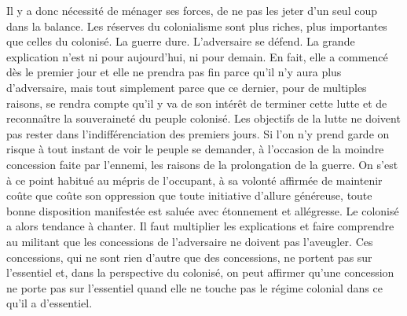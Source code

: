 \documentclass[french,twoside]{book} %
\begin{document}
Il y a donc nécessité de ménager ses forces, de ne pas les jeter d’un seul coup dans la balance. Les réserves du colonialisme sont plus riches, plus importantes que celles du colonisé. La guerre dure. L’adversaire se défend. La grande explication   n’est ni pour aujourd’hui, ni pour demain. En fait, elle a commencé dès le premier jour et elle ne prendra pas fin parce qu’il n’y aura plus d’adversaire, mais tout simplement parce que ce dernier, pour de multiples raisons, se rendra compte qu’il y va de son intérêt de terminer cette lutte et de reconnaître la souveraineté du peuple colonisé. Les objectifs de la lutte ne doivent pas rester dans l’indifférenciation des premiers jours. Si l’on n’y prend garde on risque à tout instant de voir le peuple se demander, à l’occasion de la moindre concession faite par l’ennemi, les raisons de la prolongation de la guerre. On s’est à ce point habitué au mépris de l’occupant, à sa volonté affirmée de maintenir coûte que coûte son oppression que toute initiative d’allure généreuse, toute bonne disposition manifestée est saluée avec étonnement et allégresse. Le colonisé a alors tendance à chanter. Il faut multiplier les explications et faire comprendre au militant que les concessions de l’adversaire ne doivent pas l’aveugler. Ces concessions, qui ne sont rien d’autre que des concessions, ne portent pas sur l’essentiel et, dans la perspective du colonisé, on peut affirmer qu’une concession ne porte pas sur l’essentiel quand elle ne touche pas le régime colonial dans ce qu’il a d’essentiel.\par
\end{document}
